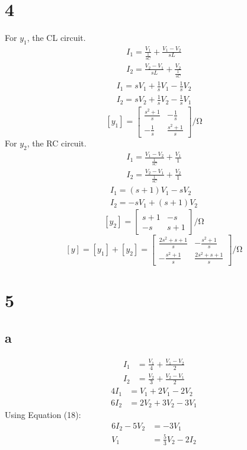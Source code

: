 \documentclass{article}
\begin{document}
\begin{multicols}{2}
\section*{4}
For $y_1$, the CL circuit.
\begin{align}
I_1 = \frac{V_1}{\frac{1}{sC}} + \frac{V_1 - V_2}{sL}\\
I_2 = \frac{V_2 - V_1}{sL} + \frac{V_2}{\frac{1}{sC}}
\end{align}
\begin{align*}
    I_1 = sV_1 + \frac{1}{s} V_1 - \frac{1}{s}V_2\\
    I_2 = sV_2 + \frac{1}{s} V_2 - \frac{1}{s}V_1
\end{align*}
$$
  [y_1] = 
  \begin{bmatrix}
  \frac{s^2 +1}{s} & -\frac{1}{s}\\
  -\frac{1}{s} & \frac{s^2 +1}{s}
  \end{bmatrix}
  \si{\per\ohm}
$$
For $y_2$, the RC circuit.
\begin{align}
I_1 = \frac{V_1-V_2}{\frac{1}{sC}} + \frac{V_1}{1}\\
I_2 = \frac{V_2-V_1}{\frac{1}{sC}} + \frac{V_2}{1}
\end{align}
\begin{align*}
    I_1 = (s+1)V_1 - s V_2\\
    I_2 = -sV_1 + (s+1)V_2
\end{align*}
$$
  [y_2] = 
  \begin{bmatrix}
  s+1 & -s\\
  -s & s+1
  \end{bmatrix}
  \si{\per\ohm}
$$
$$
[y] = [y_1] + [y_2] = 
  \begin{bmatrix}
  \frac{2s^2 + s + 1}{s} & -\frac{s^2+1}{s}\\
  -\frac{s^2+1}{s} & \frac{2s^2 + s + 1}{s}
  \end{bmatrix}
  \si{\per\ohm}
$$
\section*{5}
\subsection*{a}
\begin{align}
    I_1 &= \frac{V_1}{4} + \frac{V_1 - V_2}{2}\\
    I_2 &= \frac{V_2}{3} + \frac{V_2 - V_1}{2}
\end{align}
\begin{align}
    4 I_1 &= V_1 + 2 V_1 - 2 V_2\\
    6 I_2 &= 2 V_2 + 3 V_2 - 3 V_1
\end{align}
Using Equation (18):
\begin{align*}
    6 I_2 - 5 V_2 &= - 3 V_1\\
    V_1 &= \frac{5}{3} V_2 - 2 I_2
\end{align*}


\end{multicols}
\end{document}
